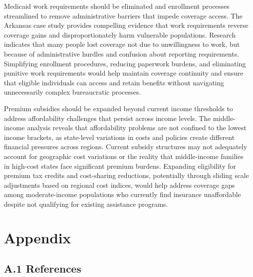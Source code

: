 \documentclass[
]{article}
\begin{document}
Medicaid work requirements should be eliminated and enrollment processes
streamlined to remove administrative barriers that impede coverage
access. The Arkansas case study provides compelling evidence that work
requirements reverse coverage gains and disproportionately harm
vulnerable populations. Research indicates that many people lost
coverage not due to unwillingness to work, but because of administrative
hurdles and confusion about reporting requirements. Simplifying
enrollment procedures, reducing paperwork burdens, and eliminating
punitive work requirements would help maintain coverage continuity and
ensure that eligible individuals can access and retain benefits without
navigating unnecessarily complex bureaucratic processes.

Premium subsidies should be expanded beyond current income thresholds to
address affordability challenges that persist across income levels. The
middle-income analysis reveals that affordability problems are not
confined to the lowest income brackets, as state-level variations in
costs and policies create different financial pressures across regions.
Current subsidy structures may not adequately account for geographic
cost variations or the reality that middle-income families in high-cost
states face significant premium burdens. Expanding eligibility for
premium tax credits and cost-sharing reductions, potentially through
sliding scale adjustments based on regional cost indices, would help
address coverage gaps among moderate-income populations who currently
find insurance unaffordable despite not qualifying for existing
assistance programs.

\section{Appendix}\label{appendix}

\subsection{A.1 References}\label{a.1-references}
\end{document}
